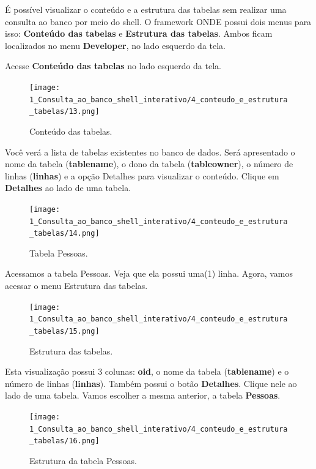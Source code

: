 \documentclass[9pt]{report}
\begin{document}
{    É possível visualizar o conteúdo e a estrutura das tabelas sem
    realizar uma consulta ao banco por meio do shell. O framework
    ONDE possui dois menus para isso: \textbf{Conteúdo das tabelas} e
    \textbf{Estrutura das tabelas}. Ambos ficam localizados no menu
    \textbf{Developer}, no lado esquerdo da tela.

    Acesse \textbf{Conteúdo das tabelas} no lado esquerdo da tela.

    \begin{figure}[H]
     \texttt{[image: 1\_Consulta\_ao\_banco\_shell\_interativo/4\_conteudo\_e\_estrutura\_tabelas/13.png]}     
     \caption{Conteúdo das tabelas.}
     \label{fig:conttabelas}
    \end{figure}

    Você verá a lista de tabelas existentes no banco de dados. Será
    apresentado o nome da tabela (\textbf{tablename}), o dono da
    tabela (\textbf{tableowner}), o número de linhas
    (\textbf{linhas}) e a opção Detalhes para visualizar o conteúdo.
    Clique em \textbf{Detalhes} ao lado de uma tabela.
    
    \begin{figure}[H]
     \texttt{[image: 1\_Consulta\_ao\_banco\_shell\_interativo/4\_conteudo\_e\_estrutura\_tabelas/14.png]}
     \caption{Tabela Pessoas.}
     \label{fig:conttabelapes}
    \end{figure}

    Acessamos a tabela Pessoas. Veja que ela possui uma(1) linha.
    Agora, vamos acessar o menu Estrutura das tabelas.

    \begin{figure}[H]
     \texttt{[image: 1\_Consulta\_ao\_banco\_shell\_interativo/4\_conteudo\_e\_estrutura\_tabelas/15.png]}
     \caption{Estrutura das tabelas.}
     \label{fig:estruturatabelas}
    \end{figure}

    Esta visualização possui 3 colunas: \textbf{oid}, o nome da
    tabela (\textbf{tablename}) e o número de linhas
    (\textbf{linhas}). Também possui o botão \textbf{Detalhes}.
    Clique nele ao lado de uma tabela. Vamos escolher a mesma
    anterior, a tabela \textbf{Pessoas}.

    \begin{figure}[H]
     \texttt{[image: 1\_Consulta\_ao\_banco\_shell\_interativo/4\_conteudo\_e\_estrutura\_tabelas/16.png]}
     \caption{Estrutura da tabela Pessoas.}
     \label{fig:estruturapessoas}     
    \end{figure}
    
}
\end{document}
